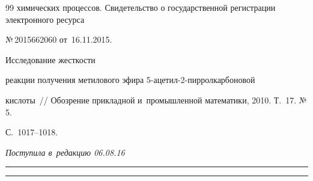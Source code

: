 {{\begin{thebibliography}{99}
химических процессов. Свидетельство о государственной регистрации электронного ресурса  


№\,2015662060 от~16.11.2015.




   Исследование жесткости 


реакции получения метилового эфира 5-аце\-тил-2-пир\-рол\-кар\-бо\-но\-вой  


кис\-ло\-ты~/\!\!/ Обозрение прикладной и~промышленной математики, 2010. Т.~17. №\,5. 


С.~1017--1018. 










       \end{thebibliography}


} }








\vspace*{-3pt}





\hfill{\small\textit{Поступила в~редакцию 06.08.16}}














\vspace*{9pt}





\hrule










\vspace*{2pt}





\hrule





